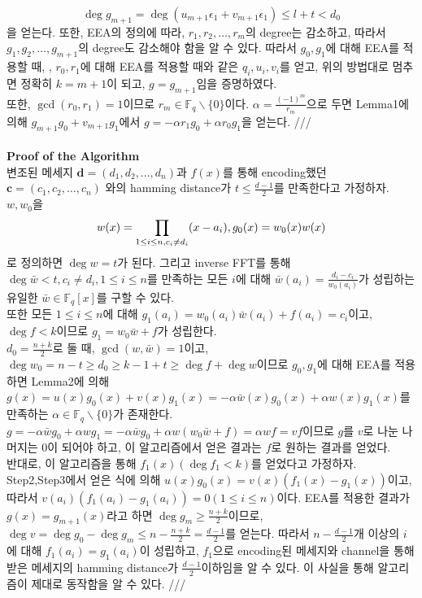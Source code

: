 \documentclass[11pt]{article}
\begin{document}
\begin{displaymath}
\deg g_{m+1} = \deg (u_{m+1}\epsilon_{1}+v_{m+1}\epsilon_{1})\leq l+t<d_{0}
\end{displaymath}
을 얻는다. 또한, EEA의 정의에 따라, $r_{1},r_{2},\dots,r_{m}$의 degree는 감소하고, 따라서 $g_{1},g_{2},\dots,g_{m+1}$의 degree도 감소해야 함을 알 수 있다. 따라서 $g_{0},g_{1}$에 대해 EEA를 적용할 때, , $r_{0},r_{1}$에 대해 EEA를 적용할 때와 같은 $q_{i},u_{i},v_{i}$를 얻고, 위의 방법대로 멈추면 정확히 $k=m+1$이 되고, $g=g_{m+1}$임을 증명하였다.\\
또한, $\gcd(r_{0},r_{1})=1$이므로 $r_{m}\in\mathbb{F}_{q}\backslash\{0\}$이다. $\alpha = \frac{(-1)^{m}}{r_{m}}$으로 두면 Lemma1에 의해   $g_{m+1}g_{0}+v_{m+1}g_{1}$에서 $g=-\alpha r_{1}g_{0}+\alpha r_{0}g_{1}$을 얻는다. ///\\\\
\textbf{Proof of the Algorithm}\\
변조된 메세지 $\mathbf{d}=(d_{1},d_{2},\dots,d_{n})$과 $f(x)$를 통해 encoding했던 $\mathbf{c}=(c_{1},c_{2},\dots,c_{n})$ 와의 hamming distance가 $t\leq \frac{d-1}{2}$를 만족한다고 가정하자. $w,w_{0}$을
\begin{displaymath}
w(x)=\prod_{1\leq i\leq n, \\ c_{i}\neq d_{i}}(x-a_{i}), g_{0}(x)=w_{0}(x)w(x)
\end{displaymath}
로 정의하면 $\deg w =t$가 된다. 그리고 inverse FFT를 통해 $\deg\bar{w}<t, c_{i}\neq d_{i},1\leq i\leq n$를 만족하는 모든 $i$에 대해 $\bar{w}(a_{i})=\frac{d_{i}-c_{i}}{w_{0}(a_i)}$가 성립하는 유일한 $\bar{w}\in\mathbb{F}_{q}[x]$를 구할 수 있다.\\
또한 모든 $1\leq i\leq n$에 대해 $g_{1}(a_{i})=w_{0}(a_{i})\bar{w}(a_{i})+f(a_{i})=c_{i}$이고, $\deg f<k$이므로 $g_{1}=w_{0}\bar{w}+f$가 성립한다.\\
$d_{0}=\frac{n+k}{2}$로 둘 때, $\gcd(w,\bar{w})=1$이고, $\deg w_{0}=n-t\geq d_{0}\geq k-1+t\geq \deg f+\deg w$이므로 $g_{0},g_{1}$에 대해 EEA를 적용하면 Lemma2에 의해 $g(x)=u(x)g_{0}(x)+v(x)g_{1}(x)=-\alpha\bar{w}(x)g_{0}(x)+\alpha w(x)g_{1}(x)$를 만족하는 $\alpha\in\mathbb{F}_{q}\backslash\{0\}$가 존재한다.\\$g=-\alpha\bar{w}g_{0}+\alpha wg_{1}=-\alpha\bar{w}g_{0}+\alpha w(w_{0}\bar{w}+f)=\alpha wf=vf$이므로 $g$를 $v$로 나눈 나머지는 0이 되어야 하고, 이 알고리즘에서 얻은 결과는 $f$로 원하는 결과를 얻었다.\\
반대로, 이 알고리즘을 통해 $f_{1}(x)(\deg f_{1}<k)$를 얻었다고 가정하자.  Step2,Step3에서 얻은 식에 의해 $u(x)g_{0}(x)=v(x)(f_{1}(x)-g_{1}(x))$이고, 따라서 $v(a_{i})(f_{1}(a_{i})-g_{1}(a_{i}))=0(1\leq i\leq n)$이다. EEA를 적용한 결과가 $g(x)=g_{m+1}(x)$라고 하면 $\deg g_{m}\geq \frac{n+k}{2}$이므로, $\deg v = \deg g_{0}-\deg g_{m}\leq n-\frac{n+k}{2}=\frac {d-1}{2}$를 얻는다. 따라서 $n-\frac{d-1}{2}$개 이상의 $i$에 대해 $f_{1}(a_{i})=g_{1}(a_{i})$이 성립하고, $f_{1}$으로 encoding된 메세지와 channel을 통해 받은 메세지의 hamming distance가 $\frac{d-1}{2}$이하임을 알 수 있다. 이 사실을 통해 알고리즘이 제대로 동작함을 알 수 있다. ///
\end{document}

